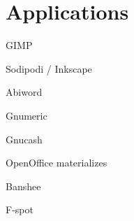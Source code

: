 \chapter{Applications}

GIMP

Sodipodi / Inkscape

Abiword

Gnumeric

Gnucash

OpenOffice materializes

Banshee

F-spot

